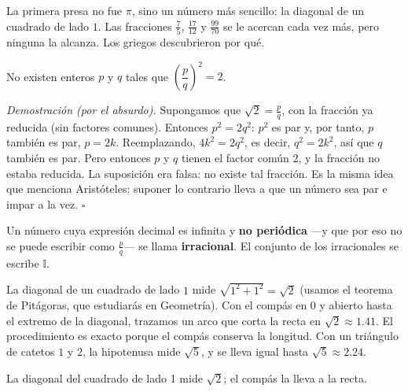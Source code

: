 \documentclass[11pt]{article}
\newcommand{\I}{\mathbb{I}}
\begin{document}
\begin{hilo}
La primera presa no fue $\pi$, sino un número más sencillo: la diagonal de
un cuadrado de lado $1$. Las fracciones $\frac{7}{5}$, $\frac{17}{12}$ y
$\frac{99}{70}$ se le acercan cada vez más, pero ninguna la alcanza. Los
griegos descubrieron por qué.
\end{hilo}

\begin{teorema}
No existen enteros $p$ y $q$ tales que $\left(\dfrac{p}{q}\right)^2 = 2$.
\end{teorema}

\emph{Demostración (por el absurdo).} Supongamos que $\sqrt{2} = \frac{p}{q}$,
con la fracción ya reducida (sin factores comunes). Entonces $p^2 = 2q^2$:
$p^2$ es par y, por tanto, $p$ también es par, $p = 2k$. Reemplazando,
$4k^2 = 2q^2$, es decir, $q^2 = 2k^2$, así que $q$ también es par. Pero
entonces $p$ y $q$ tienen el factor común $2$, y la fracción no estaba
reducida. La suposición era falsa: no existe tal fracción. Es la misma idea
que menciona Aristóteles: suponer lo contrario lleva a que un número sea par
e impar a la vez. \hfill$\square$

\begin{definicion}
Un número cuya expresión decimal es infinita y \textbf{no periódica} —y que
por eso no se puede escribir como $\frac{p}{q}$— se llama
\textbf{irracional}. El conjunto de los irracionales se escribe $\I$.
\end{definicion}

\begin{ejemplo}
La diagonal de un cuadrado de lado $1$ mide $\sqrt{1^2 + 1^2} = \sqrt{2}$
(usamos el teorema de Pitágoras, que estudiarás en Geometría). Con el compás
en $0$ y abierto hasta el extremo de la diagonal, trazamos un arco que corta
la recta en $\sqrt{2} \approx \num{1,41}$. El procedimiento es exacto porque
el compás conserva la longitud. Con un triángulo de catetos $1$ y $2$, la
hipotenusa mide $\sqrt{5}$, y se lleva igual hasta $\sqrt{5} \approx \num{2,24}$.
\end{ejemplo}

\begin{center}

{\small La diagonal del cuadrado de lado 1 mide $\sqrt{2}$; el compás la lleva a la recta.}
\end{center}
\end{document}
